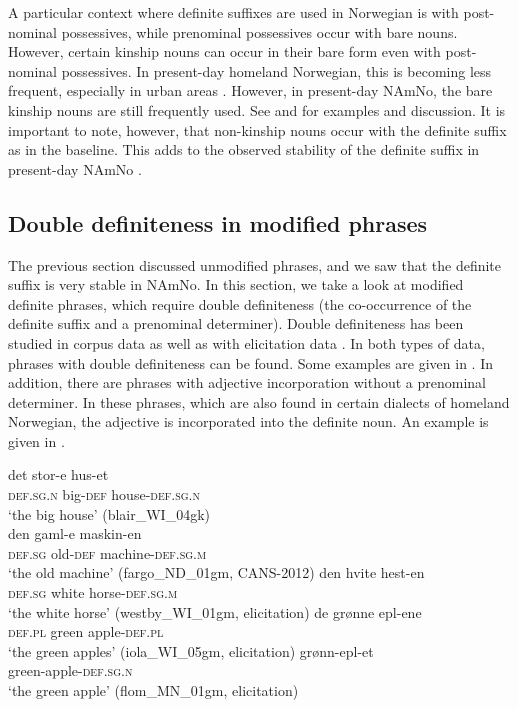 \documentclass[output=paper]{langscibook}
\begin{document}
A particular context where definite suffixes are used in Norwegian is with post\hyp nominal possessives, while prenominal possessives occur with bare nouns. However, certain kinship nouns can occur in their bare form even with post\hyp nominal possessives. In present-day homeland Norwegian, this is becoming less frequent, especially in urban areas \citep[26--27]{Kinn2021}. However, in present-day NAmNo, the bare kinship nouns are still frequently used. See \citet{Kinn2021} and  for examples and discussion. It is important to note, however, that non-kinship nouns occur with the definite suffix as in the baseline. This adds to the observed stability of the definite suffix in present-day NAmNo \citep{vanBaal2020,vanBaal2024Definiteness}.
 

\subsection{Double definiteness in modified phrases} \label{Sect-DoubleDef}
The previous section discussed unmodified phrases, and we saw that the definite suffix is very stable in NAmNo. In this section, we take a look at modified definite phrases, which require double definiteness (the co-occurrence of the definite suffix and a prenominal determiner). Double definiteness has been studied in corpus data \citep{ALW2018} as well as with elicitation data \citep{vanBaal2020,vanBaal2024Definiteness}. In both types of data, phrases with double definiteness can be found. Some examples are given in . In addition, there are phrases with adjective incorporation without a prenominal determiner. In these phrases, which are also found in certain dialects of homeland Norwegian, the adjective is incorporated into the definite noun. An example is given in .
 

\ea \label{ex:vanbaal:28}
\ea \label{ex:vanbaal:28a}
\gll det stor-e hus-et \\
    \textsc{def.sg.n} big-\textsc{def} house-\textsc{def.sg.n} \\
\glt `the big house' (blair\_WI\_04gk) \\
\citep[755]{ALW2018}
\ex  \label{ex:vanbaal:28b}
\gll den gaml-e maskin-en \\
    \textsc{def.sg} old-\textsc{def} machine-\textsc{def.sg.m} \\
\glt `the old machine' (fargo\_ND\_01gm, CANS-2012)
\ex\label{ex:vanbaal:28c}
\gll den hvite hest-en \\
    \textsc{def.sg} white horse-\textsc{def.sg.m} \\
\glt `the white horse' (westby\_WI\_01gm, elicitation)
\ex \label{ex:vanbaal:28d}
\gll de grønne epl-ene \\
    \textsc{def.pl} green apple-\textsc{def.pl} \\
\glt `the green apples' (iola\_WI\_05gm, elicitation)
\z
\ex \label{ex:vanbaal:29}
\gll grønn-epl-et \\
    green-apple-\textsc{def.sg.n} \\
\glt `the green apple' (flom\_MN\_01gm, elicitation)
\z
\end{document}
